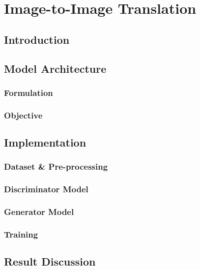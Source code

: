 \section{Image-to-Image Translation}

\subsection{Introduction}

\subsection{Model Architecture}

\subsubsection{Formulation}

\subsubsection{Objective}

\subsection{Implementation}

\subsubsection{Dataset & Pre-processing}

\subsubsection{Discriminator Model}

\subsubsection{Generator Model}

\subsubsection{Training}

\subsection{Result Discussion}

\newpage
